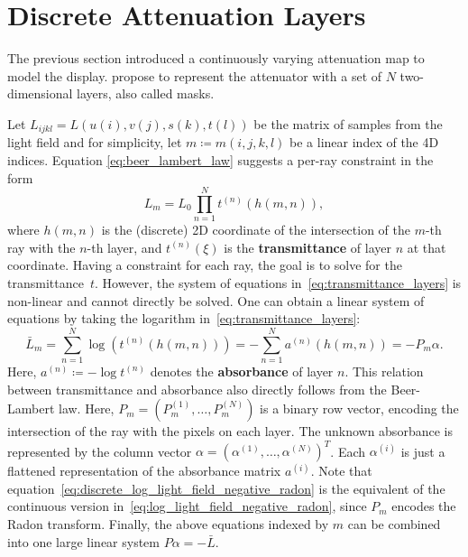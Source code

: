 \section{Discrete Attenuation Layers}

The previous section introduced a continuously varying attenuation map to model the display.
\cite{WetzsteinTomo} propose to represent the attenuator with a set of $N$ two-dimensional layers, also called masks.

Let $L_{ijkl} = L(u(i), v(j), s(k), t(l))$ be the matrix of samples from the light field and for simplicity, let $m \coloneqq m(i, j, k, l)$ be a linear index of the 4D indices.
Equation \ref{eq:beer_lambert_law} suggests a per-ray constraint in the form
\begin{equation}\label{eq:transmittance_layers}
	L_m = L_0 \prod_{n=1}^{N} t^{(n)} (h(m, n)), 
\end{equation}
where $h(m, n)$ is the (discrete) 2D coordinate of the intersection of the \mbox{$m$-th} ray with the \mbox{$n$-th} layer, and $t^{(n)}(\xi)$ is the \textbf{transmittance} of layer $n$ at that coordinate.
Having a constraint for each ray, the goal is to solve for the transmittance~$t$.
However, the system of equations in~\ref{eq:transmittance_layers} is non-linear and cannot directly be solved.
One can obtain a linear system of equations by taking the logarithm in~\ref{eq:transmittance_layers}:
\begin{equation}\label{eq:discrete_log_light_field_negative_radon}
	\bar{L}_m 	=	\sum_{n = 1}^{N}
					\log \left( t^{(n)} (h(m, n)) \right) 
				= 	-\sum_{n = 1}^{N} a^{(n)} (h(m, n)) 
				= -P_m \alpha.
\end{equation}
Here, $a^{(n)} \coloneqq -\log t^{(n)}$ denotes the \textbf{absorbance} of layer $n$. 
This relation between transmittance and absorbance also directly follows from the Beer-Lambert law.
Here, $P_m = \left( P_m^{(1)}, \dots, P_m^{(N)} \right)$ is a binary row vector, encoding the intersection of the ray with the pixels on each layer.
The unknown absorbance is represented by the column vector $\alpha = \left( \alpha^{(1)}, \dots, \alpha^{(N)} \right)^T$.
Each $\alpha^{(i)}$ is just a flattened representation of the absorbance matrix $a^{(i)}$.
Note that equation~\ref{eq:discrete_log_light_field_negative_radon} is the equivalent of the continuous version in~\ref{eq:log_light_field_negative_radon}, since $P_m$ encodes the Radon transform.
Finally, the above equations indexed by $m$ can be combined into one large linear system $P \alpha = -\bar{L}$.

